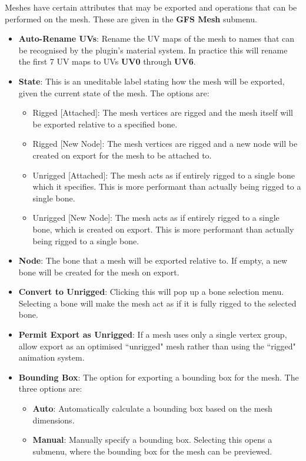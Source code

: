 \documentclass{article}
\begin{document}
Meshes have certain attributes that may be exported and operations that can be performed on the mesh. These are given in the \textbf{GFS Mesh} submenu.
\begin{itemize}
\item \textbf{Auto-Rename UVs}: Rename the UV maps of the mesh to names that can be recognised by the plugin's material system. In practice this will rename the first 7 UV maps to UVs \textbf{UV0} through \textbf{UV6}.
\item \textbf{State}: This is an uneditable label stating how the mesh will be exported, given the current state of the mesh. The options are:
\begin{itemize}
\item Rigged [Attached]: The mesh vertices are rigged and the mesh itself will be exported relative to a specified bone.
\item Rigged [New Node]: The mesh vertices are rigged and a new node will be created on export for the mesh to be attached to.
\item Unrigged [Attached]: The mesh acts as if entirely rigged to a single bone which it specifies. This is more performant than actually being rigged to a single bone.
\item Unrigged [New Node]: The mesh acts as if entirely rigged to a single bone, which is created on export. This is more performant than actually being rigged to a single bone.
\end{itemize}
\item \textbf{Node}: The bone that a mesh will be exported relative to. If empty, a new bone will be created for the mesh on export.
\item \textbf{Convert to Unrigged}: Clicking this will pop up a bone selection menu. Selecting a bone will make the mesh act as if it is fully rigged to the selected bone.
\item \textbf{Permit Export as Unrigged}: If a mesh uses only a single vertex group, allow export as an optimised ``unrigged" mesh rather than using the ``rigged" animation system.
\item \textbf{Bounding Box}: The option for exporting a bounding box for the mesh. The three options are:
\begin{itemize}
\item \textbf{Auto}: Automatically calculate a bounding box based on the mesh dimensions.
\item \textbf{Manual}: Manually specify a bounding box. Selecting this opens a submenu, where the bounding box for the mesh can be previewed.

\end{itemize}
\end{itemize}
\end{document}
